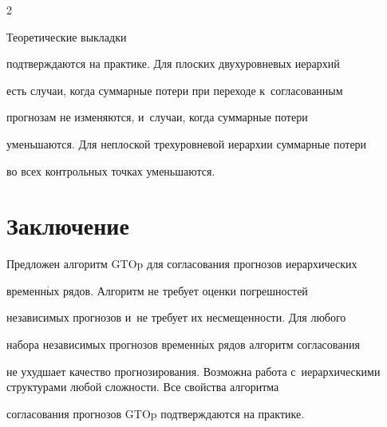 \begin{multicols}{2}


Теоретические выкладки

подтверждаются на практике. Для плоских двухуровневых иерархий

есть случаи, когда суммарные потери при переходе к~согласованным

прогнозам не изменяются, и~случаи, когда суммарные потери

уменьшаются. Для неплоской трехуровневой иерархии суммарные потери

во всех контрольных точках уменьшаются.





\section{Заключение}



Предложен алгоритм GTOp для согласования прогнозов иерархических

временн$\acute{\mbox{ы}}$х рядов. Алгоритм не требует оценки погрешностей

независимых прогнозов и~не требует их несмещенности. Для любого

набора независимых прогнозов временн$\acute{\mbox{ы}}$х рядов алгоритм согласования

не ухудшает качество прогнозирования. Возможна работа с~иерархическими структурами любой сложности. Все свойства алгоритма

согласования прогнозов GTOp под\-тверж\-да\-ются на практике.



\pagebreak



\end{multicols}



